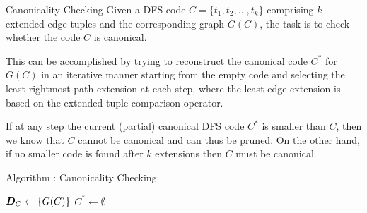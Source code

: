 \begin{frame}{Canonicality Checking}
Given a DFS code $C
= \{t_1, t_2, \ldots, t_k\}$ comprising $k$ extended edge tuples
and the corresponding graph $G(C)$, the task is to check whether
the code $C$ is canonical. 

\medskip
This can be accomplished by trying to
reconstruct the canonical code $C^*$ for $G(C)$ in an iterative
manner starting from the empty code and selecting the least
rightmost path extension at each step, where the least edge
extension is based on the extended tuple comparison operator.

\medskip
If at any step the current
(partial) canonical DFS code $C^*$ is smaller than $C$, then we
know that $C$ cannot be canonical and can thus be pruned. On the
other hand, if no smaller code is found after $k$ extensions then
$C$ must be canonical. 
\end{frame}



\begin{frame}[fragile]{Algorithm \algcanonical: Canonicality Checking}
\begin{tightalgo}[H]{\textwidth-18pt}
  \iscanonical{}
  ${\boldsymbol D}_C \gets \{G(C)\}$ 
  $C^* \gets \emptyset$ 
   
\end{tightalgo}
\end{frame}



